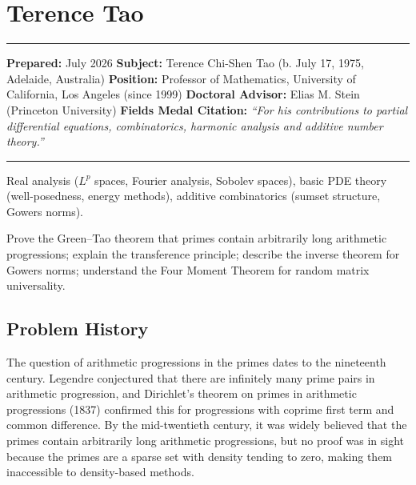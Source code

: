 \chapter{Terence Tao}\label{ch2006terencetao:terence-tao-fields-medal-2006-a-comprehensive-report-on-his-work-and-impact}

\begin{center}\rule{0.5\linewidth}{0.5pt}\end{center}

\textbf{Prepared:} July 2026 \textbf{Subject:} Terence Chi-Shen Tao (b. July 17, 1975, Adelaide, Australia) \textbf{Position:} Professor of Mathematics, University of California, Los Angeles (since 1999) \textbf{Doctoral Advisor:} Elias M. Stein (Princeton University) \textbf{Fields Medal Citation:} \emph{``For his contributions to partial differential equations, combinatorics, harmonic analysis and additive number theory.''}

\begin{center}\rule{0.5\linewidth}{0.5pt}\end{center}

\begin{prereqs} Real analysis ($L^p$ spaces, Fourier analysis, Sobolev spaces), basic PDE theory (well-posedness, energy methods), additive combinatorics (sumset structure, Gowers norms). \end{prereqs}

\begin{objectives} Prove the Green--Tao theorem \cite{greentao2008} that primes contain arbitrarily long arithmetic progressions; explain the transference principle; describe the inverse theorem for Gowers norms; understand the Four Moment Theorem for random matrix universality. \end{objectives}

\section{Problem History}

The question of arithmetic progressions in the primes dates to the nineteenth century. Legendre conjectured that there are infinitely many prime pairs in arithmetic progression, and Dirichlet's theorem on primes in arithmetic progressions (1837) confirmed this for progressions with coprime first term and common difference. By the mid-twentieth century, it was widely believed that the primes contain arbitrarily long arithmetic progressions, but no proof was in sight because the primes are a sparse set with density tending to zero, making them inaccessible to density-based methods.


